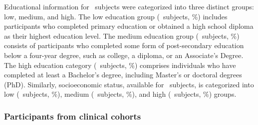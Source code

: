Educational information for \TotalSubjectsWithEducationCount\ subjects were categorized into three distinct groups: low, medium, and high. 
The low education group (\TotalSubjectsWithLowEducationCount\ subjects, \TotalSubjectsWithLowEducationPercentage\%) includes participants 
who completed primary education or obtained a high school diploma as their highest education level. 
The medium education group (\TotalSubjectsWithMediumEducationCount\ subjects, \TotalSubjectsWithMediumEducationPercentage\%) consists 
of participants who completed some form of post-secondary education below a four-year degree, such as college, a diploma, or an Associate's Degree. 
The high education category (\TotalSubjectsWithHighEducationCount\ subjects, \TotalSubjectsWithHighEducationPercentage\%) comprises individuals 
who have completed at least a Bachelor's degree, including Master's or doctoral degrees (PhD). 
Similarly, socioeconomic status, available for \TotalSubjectsWithSocioEconomicCount\ subjects, is categorized into 
low (\TotalSubjectsWithLowEconomicCount\ subjects, \TotalSubjectsWithLowEconomicPercentage\%), 
medium (\TotalSubjectsWithMediumEconomicCount\ subjects, \TotalSubjectsWithMediumEconomicPercentage\%), and high (\TotalSubjectsWithHighEconomicCount\ subjects, 
\TotalSubjectsWithHighEconomicPercentage\%) groups.



\subsubsection{Participants from clinical cohorts}

